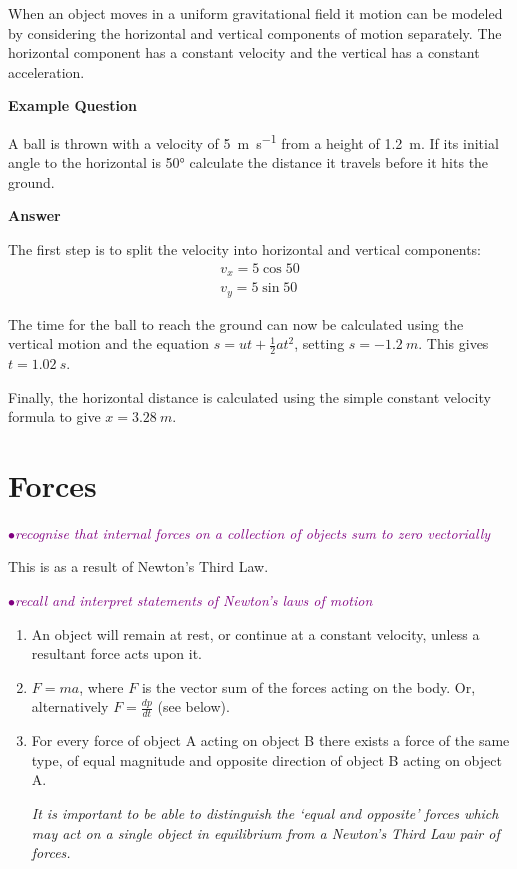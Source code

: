 \documentclass[a4paper,11pt,twoside]{memoir}
\newcounter{spec}[chapter]
\newcommand{\spec}[1]{\Needspace{5\baselineskip}\textcolor{purple}{$\bullet$\hspace{0.5cm}\textit{#1}}}
\newcommand{\answer}{\par \textbf{Answer} \par}
\newenvironment{example}
{\begin{lrbox}{\examplebox}\begin{minipage}{0.9\textwidth}\textbf{Example Question}\par}
{\end{minipage}\end{lrbox}\fbox{\usebox{\examplebox}}}
\begin{document}
When an object moves in a uniform gravitational field it motion can be modeled by considering the horizontal and vertical components of motion separately. The horizontal component has a constant velocity and the vertical has a constant acceleration.

\begin{example}
A ball is thrown with a velocity of \SI{5}{m.s^{-1}} from a height of \SI{1.2}{m}. If its initial angle to the horizontal is \ang{50} calculate the distance it travels before it hits the ground.
\answer

The first step is to split the velocity into horizontal and vertical components:
	\begin{align*}
		v_x = 5\cos{50}\\
		v_y = 5\sin{50}
	\end{align*}

	The time for the ball to reach the ground can now be calculated using the vertical motion and the equation $s=ut+\frac{1}{2}at^2$, setting $s = \SI{-1.2}{m}$. This gives $t=\SI{1.02}{s}$.

	Finally, the horizontal distance is calculated using the simple constant velocity formula to give $x=\SI{3.28}{m}$.
\end{example}

\section{Forces}

\spec{recognise that internal forces on a collection of objects sum to zero vectorially}

This is as a result of Newton's Third Law.

\spec{recall and interpret statements of Newton’s laws of motion}
\begin{enumerate}
	\item An object will remain at rest, or continue at a constant velocity, unless a resultant force acts upon it.
	\item $F=ma$, where $F$ is the vector sum of the forces acting on the body. Or, alternatively $F=\frac{dp}{dt}$ (see below).
	\item For every force of object A acting on object B there exists a force of the same type, of equal magnitude and opposite direction of object B acting on object A.

	\emph{It is important to be able to distinguish the `equal and opposite' forces which may act on a single object in equilibrium from a Newton's Third Law pair of forces.}
\end{enumerate}
\end{document}
